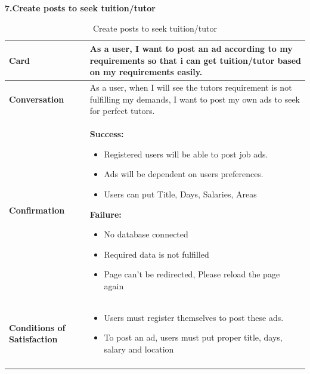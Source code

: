 \textbf{7.Create posts to seek tuition/tutor}
\begin{center}
\setlength{\tabcolsep}{0.8cm}
\renewcommand{\arraystretch}{1.2}
        \centering
        \begin{longtable}{|m{70pt}|p{9cm}|}
            \hline
                \textbf{Card} &
                As a user, I want to post an ad according to my requirements so that i can get tuition/tutor based on my requirements easily.\\
            \hline
                \textbf{Conversation} &
                    As a user, when I will see the tutors requirement is not fulfilling my demands, I want to post my own ads to seek for perfect tutors.\\
            \hline
                \textbf{Confirmation} &
                     \textbf{ Success:}
                        \begin{itemize}
                            \item Registered users will be able to post job ads.
                            \item Ads will be dependent on users preferences.
                            \item Users can put Title, Days, Salaries, Areas
                        \end{itemize}
                    \textbf{Failure:}
                        \begin{itemize}
                            \item No database connected
                            \item Required data is not fulfilled 
                            \item Page can't be redirected, Please reload the page again
                        \end{itemize}\\
            \hline
                \textbf{Conditions of Satisfaction} &  
                        \begin{itemize}
                            \item Users must register themselves to post these ads. 
                            \item To post an ad, users must put proper title, days, salary and location
                        \end{itemize}\\
            \hline
        \caption{Create posts to seek tuition/tutor}
        \label{tab:my_label}
        \end{longtable}
\end{center}


